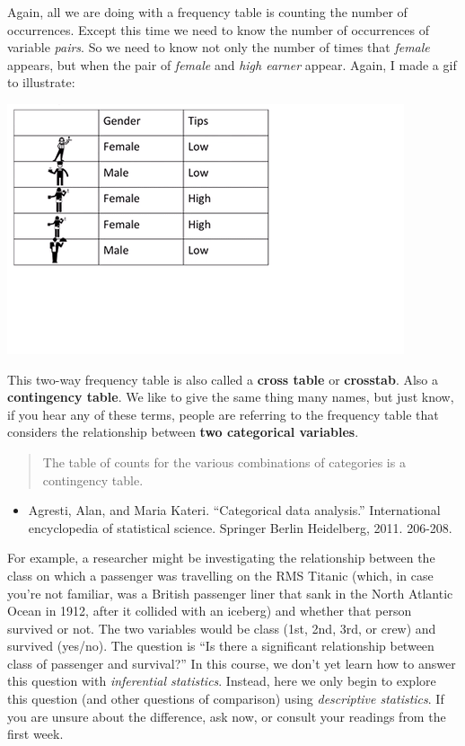 \documentclass[]{book}
\providecommand{\tightlist}{%
  \setlength{\itemsep}{0pt}\setlength{\parskip}{0pt}}
\theoremstyle{definition}
\theoremstyle{definition}
\theoremstyle{definition}
\theoremstyle{remark}
\begin{document}
Again, all we are doing with a frequency table is counting the number of
occurrences. Except this time we need to know the number of occurrences
of variable \emph{pairs}. So we need to know not only the number of
times that \emph{female} appears, but when the pair of \emph{female} and
\emph{high earner} appear. Again, I made a gif to illustrate:

\includegraphics{imgs/bivar_freq_table_gif.gif}

This two-way frequency table is also called a \textbf{cross table} or
\textbf{crosstab}. Also a \textbf{contingency table}. We like to give
the same thing many names, but just know, if you hear any of these
terms, people are referring to the frequency table that considers the
relationship between \textbf{two categorical variables}.

\begin{quote}
The table of counts for the various combinations of categories is a
contingency table.
\end{quote}

\begin{itemize}
\tightlist
\item
  Agresti, Alan, and Maria Kateri. ``Categorical data analysis.''
  International encyclopedia of statistical science. Springer Berlin
  Heidelberg, 2011. 206-208.
\end{itemize}

For example, a researcher might be investigating the relationship
between the class on which a passenger was travelling on the RMS Titanic
(which, in case you're not familiar, was a British passenger liner that
sank in the North Atlantic Ocean in 1912, after it collided with an
iceberg) and whether that person survived or not. The two variables
would be class (1st, 2nd, 3rd, or crew) and survived (yes/no). The
question is ``Is there a significant relationship between class of
passenger and survival?'' In this course, we don't yet learn how to
answer this question with \emph{inferential statistics}. Instead, here
we only begin to explore this question (and other questions of
comparison) using \emph{descriptive statistics}. If you are unsure about
the difference, ask now, or consult your readings from the first week.
\end{document}
